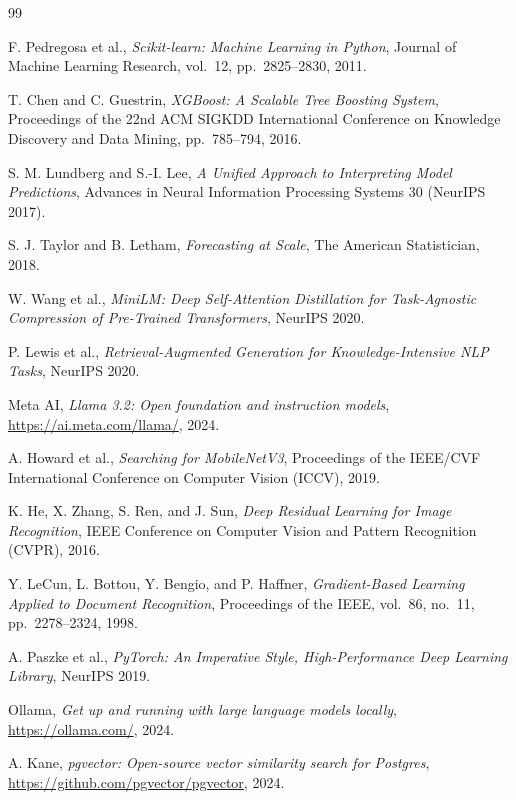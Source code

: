 \documentclass[12pt, a4paper, oneside]{report}
\begin{document}
\begin{thebibliography}{99}

F. Pedregosa et al.,
\textit{Scikit-learn: Machine Learning in Python},
Journal of Machine Learning Research, vol.~12, pp.~2825--2830, 2011.

T. Chen and C. Guestrin,
\textit{XGBoost: A Scalable Tree Boosting System},
Proceedings of the 22nd ACM SIGKDD International Conference on
Knowledge Discovery and Data Mining, pp.~785--794, 2016.

S. M. Lundberg and S.-I. Lee,
\textit{A Unified Approach to Interpreting Model Predictions},
Advances in Neural Information Processing Systems 30 (NeurIPS 2017).

S. J. Taylor and B. Letham,
\textit{Forecasting at Scale}, The American Statistician, 2018.

W. Wang et al.,
\textit{MiniLM: Deep Self-Attention Distillation for Task-Agnostic
Compression of Pre-Trained Transformers}, NeurIPS 2020.

P. Lewis et al.,
\textit{Retrieval-Augmented Generation for Knowledge-Intensive NLP
Tasks}, NeurIPS 2020.

Meta AI,
\textit{Llama 3.2: Open foundation and instruction models},
\url{https://ai.meta.com/llama/}, 2024.

A. Howard et al.,
\textit{Searching for MobileNetV3},
Proceedings of the IEEE/CVF International Conference on Computer
Vision (ICCV), 2019.

K. He, X. Zhang, S. Ren, and J. Sun,
\textit{Deep Residual Learning for Image Recognition},
IEEE Conference on Computer Vision and Pattern Recognition (CVPR),
2016.

Y. LeCun, L. Bottou, Y. Bengio, and P. Haffner,
\textit{Gradient-Based Learning Applied to Document Recognition},
Proceedings of the IEEE, vol.~86, no.~11, pp.~2278--2324, 1998.

A. Paszke et al.,
\textit{PyTorch: An Imperative Style, High-Performance Deep Learning
Library}, NeurIPS 2019.

Ollama,
\textit{Get up and running with large language models locally},
\url{https://ollama.com/}, 2024.

A. Kane,
\textit{pgvector: Open-source vector similarity search for Postgres},
\url{https://github.com/pgvector/pgvector}, 2024.


\end{thebibliography}
\end{document}

